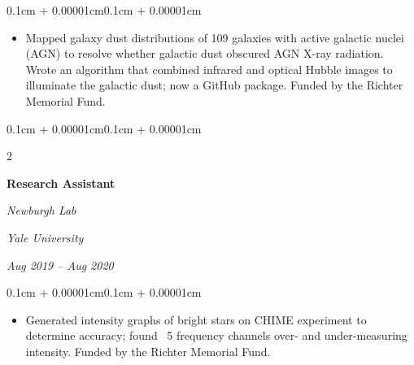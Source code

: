 \documentclass[10pt,letterpaper]{article}
\newenvironment{highlights}{
    \begin{itemize}[
        topsep=0.1cm,
        parsep=0.1cm,
        partopsep=0pt,
        itemsep=0pt,
        leftmargin=0.4cm + 10pt
    ]
}{
    \end{itemize}
}
\newenvironment{onecolentry}{
    \begin{adjustwidth}{0.1cm + 0.00001cm}{0.1cm + 0.00001cm}
}{
    \end{adjustwidth}
}
\newenvironment{twocolentry}[2][]{
    \onecolentry
    \def\secondColumn{#2}
    \setcolumnwidth{\fill,4.5cm}
    \begin{paracol}{2}
}{
    \switchcolumn \raggedleft \secondColumn
    \end{paracol}
    \endonecolentry
}
\begin{document}
        \vspace{0.10 cm}
        \begin{onecolentry}
            \begin{highlights}
                \item Mapped galaxy dust distributions of 109 galaxies with active galactic nuclei (AGN) to resolve whether galactic dust obscured AGN X-ray radiation. Wrote an algorithm that combined infrared and optical Hubble images to illuminate the galactic dust; now a GitHub package. Funded by the Richter Memorial Fund.

            \end{highlights}
        \end{onecolentry}

        \vspace{0.2 cm}

        \begin{twocolentry}{
        \textit{Yale University}    
            
        \textit{Aug 2019 – Aug 2020}}
            \textbf{Research Assistant}
            
            \textit{Newburgh Lab}
        \end{twocolentry}

        \vspace{0.10 cm}
        \begin{onecolentry}
            \begin{highlights}
                \item Generated intensity graphs of bright stars on CHIME experiment to determine accuracy; 
                found ~5 frequency channels over- and under-measuring intensity. Funded by the Richter Memorial Fund.
            \end{highlights}
        \end{onecolentry}
        
\end{document}
